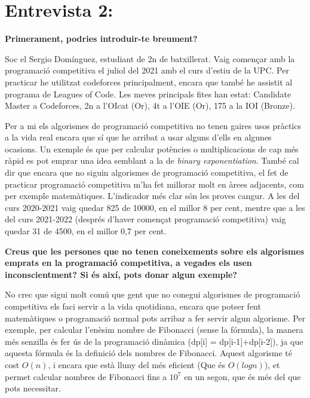 \section{Entrevista 2:}

\textbf{Primerament, podries introduir-te breument?} \newline

Soc el Sergio Domínguez, estudiant de 2n de batxillerat. Vaig començar amb la programació competitiva el juliol del 2021 amb el curs d'estiu de la UPC. Per practicar he utilitzat codeforces principalment, encara que també he assistit al programa de Leagues of Code.
Les meves principals fites han estat: Candidate Master a Codeforces, 2n a l'OIcat (Or), 4t a l'OIE (Or), 175 a la IOI (Bronze). \newline


Per a mi els algorismes de programació competitiva no tenen gaires usos pràctics a la vida real encara que sí que he arribat a usar alguns d'ells en algunes ocasions. Un exemple és que per calcular potències o multiplicacions de cap més ràpid es pot emprar una idea semblant a la de \emph{binary exponentiation}.
També cal dir que encara que no siguin algorismes de programació competitiva, el fet de practicar programació competitiva m'ha fet millorar molt en àrees adjacents, com per exemple matemàtiques. L'indicador més clar són les proves cangur. A les del curs 2020-2021 vaig quedar 825 de 10000, en el millor 8 per cent, mentre que a les del curs 2021-2022 (després d'haver començat programació competitiva) vaig quedar 31 de 4500, en el millor 0,7 per cent. \newline

\textbf{Creus que les persones que no tenen coneixements sobre els algorismes emprats en la programació competitiva, a vegades els usen inconscientment? Si és així, pots donar algun exemple?} \newline

No crec que sigui molt comú que gent que no conegui algorismes de programació competitiva els faci servir a la vida quotidiana, encara que potser fent matemàtiques o programació normal pots arribar a fer servir algun algorisme. Per exemple, per calcular l'enèsim nombre de Fibonacci (sense la fórmula), la manera més senzilla és fer ús de la programació dinàmica (dp[i] = dp[i-1]+dp[i-2]), ja que aquesta fórmula és la definició dels nombres de Fibonacci. Aquest algorisme té cost $O(n)$, i encara que està lluny del més eficient (Que és $O(log n)$), et permet calcular nombres de Fibonacci fins a $10^7$ en un segon, que és més del que pots necessitar.\newline

